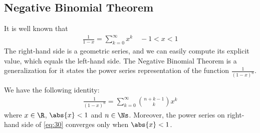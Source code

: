 \documentclass[thmcnt=section, 12pt]{elegantbook}
\begin{document}

\subsection{Negative Binomial Theorem}

\par It is well known that 
\begin{align*}
    \frac{1}{1-x} = \sum_{k=0}^\infty x^k
    \quad -1 < x < 1
\end{align*}
The right-hand side is a geometric series, and we can easily compute its explicit value, which equals the left-hand side. The Negative Binomial Theorem is a generalization for it states the power series representation of the function $\frac{1}{(1-x)^n}$.


\begin{theorem} \label{thm:16} %
    We have the following identity:
    \begin{align}
        \frac{1}{(1-x)^n}
        = \sum_{k=0}^\infty \binom{n+k-1}{k} x^k
        \label{eq:30}
    \end{align}
    where $x \in \R$, $\abs{x} < 1$ and $n \in \Ns$. Moreover, the power series on right-hand side of \eqref{eq:30} converges only when $\abs{x} < 1$.
\end{theorem}
\end{document}
